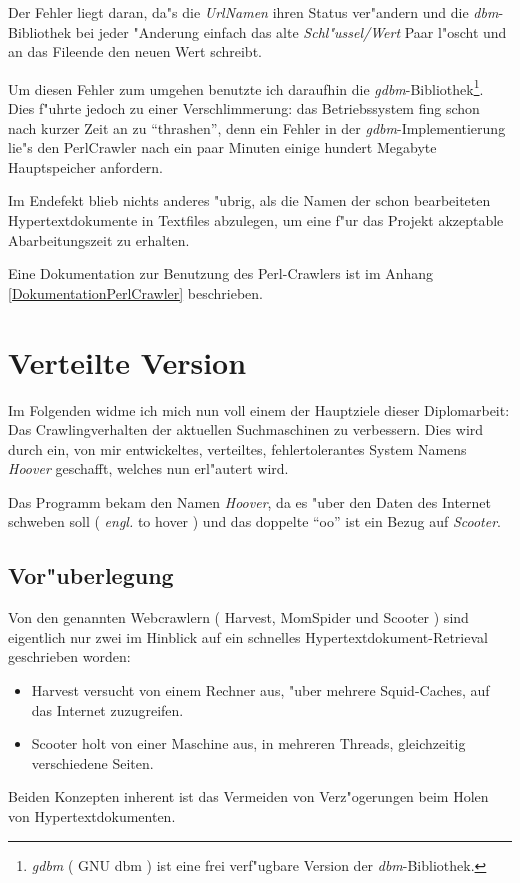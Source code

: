 Der Fehler liegt daran, da"s die {\em UrlNamen} ihren Status ver"andern und die {\em dbm}-Bibliothek bei jeder "Anderung einfach das alte {\em Schl"ussel/Wert} Paar l"oscht und an das Fileende den neuen Wert schreibt.

Um diesen Fehler zum umgehen benutzte ich daraufhin die {\em gdbm}-Bibliothek\footnote{{\em gdbm} ( GNU dbm ) ist eine frei verf"ugbare Version der {\em dbm}-Bibliothek.}. Dies f"uhrte jedoch zu einer Verschlimmerung: das Betriebssystem fing schon nach kurzer Zeit an zu "`thrashen"', denn ein Fehler in der {\em gdbm}-Implementierung lie"s den PerlCrawler nach ein paar Minuten einige hundert Megabyte Hauptspeicher anfordern.

Im Endefekt blieb nichts anderes "ubrig, als die Namen der schon bearbeiteten Hypertextdokumente in Textfiles abzulegen, um eine f"ur das Projekt akzeptable Abarbeitungszeit zu erhalten.

Eine Dokumentation zur Benutzung des Perl-Crawlers ist im Anhang \ref{DokumentationPerlCrawler} beschrieben.




\section{Verteilte Version }
Im Folgenden widme ich mich nun voll einem der Hauptziele dieser Diplomarbeit: Das Crawlingverhalten der aktuellen Suchmaschinen zu verbessern. Dies wird durch ein, von mir entwickeltes, verteiltes, fehlertolerantes System Namens {\em Hoover} geschafft, welches nun erl"autert wird.

Das Programm bekam den Namen {\em Hoover}, da es "uber den Daten des Internet schweben soll ( {\em engl.} to hover ) und das doppelte "`oo"' ist ein Bezug auf {\em Scooter}.

\subsection{Vor"uberlegung}\label{VorueberlegungVerteiltesSystem}
Von den genannten Webcrawlern ( Harvest, MomSpider und Scooter ) sind eigentlich nur zwei im Hinblick auf ein schnelles Hypertextdokument-Retrieval geschrieben worden:
\begin{itemize}
	\item Harvest versucht von einem Rechner aus, "uber mehrere Squid-Caches, auf das Internet zuzugreifen.
	\item Scooter holt von einer Maschine aus, in mehreren Threads, gleichzeitig verschiedene Seiten. 
\end{itemize}
Beiden Konzepten inherent ist das Vermeiden von Verz"ogerungen beim Holen von Hypertextdokumenten.


